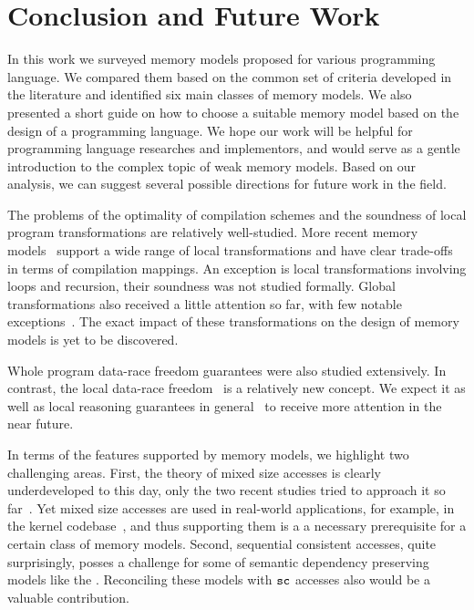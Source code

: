 \section{Conclusion and Future Work}
\label{sec:conclusion}

In this work we surveyed memory models 
proposed for various programming language. 
We compared them based on the common set of criteria
developed in the literature and identified 
six main classes of memory models.
We also presented a short guide on how to 
choose a suitable memory model based on 
the design of a programming language. 
We hope our work will be helpful for 
programming language researches and implementors,
and would serve as a gentle introduction 
to the complex topic of weak memory models. 
Based on our analysis, we can suggest several
possible directions for future work in the field. 

The problems of the optimality of compilation schemes
and the soundness of local program transformations are relatively well-studied.
More recent memory models~%
\cite{Lahav-al:PLDI17, Dolan-al:PLDI18, Kang-al:POPL17, Chakraborty-Vafeiadis:POPL19} 
support a wide range of local transformations and have clear 
trade-offs in terms of compilation mappings. 
An exception is local transformations involving loops and recursion, 
their soundness was not studied formally. 
Global transformations also received a little attention so far,
with few notable exceptions~\cite{PichonPharabod-Sewell:POPL16, Lee-al:PLDI20}.
The exact impact of these transformations on the design of 
memory models is yet to be discovered. 

Whole program data-race freedom guarantees were also studied extensively.
In contrast, the local data-race freedom~\cite{Dolan-al:PLDI18} 
is a relatively new concept. 
We expect it as well as local reasoning guarantees 
in general~\cite{Dodds-al:ESOP18, Jagadeesan-al:OOPSLA2020, Cho-al:PLDI21} 
to receive more attention in the near future.  

In terms of the features supported by memory models, 
we highlight two challenging areas.
First, the theory of mixed size accesses is clearly 
underdeveloped to this day, only the two recent studies 
tried to approach it so far~\cite{Flur-al:POPL17, Watt-al:PLDI2020}.
Yet mixed size accesses are used in real-world applications,
for example, in the \Linux kernel codebase~\cite{Flur-al:POPL17},
and thus supporting them is a a necessary prerequisite 
for a certain class of memory models. 
Second, sequential consistent accesses, quite surprisingly,
posses a challenge for some of semantic dependency preserving
models like the \Promising.
Reconciling these models with ${\mathtt{sc}}$ 
accesses also would be a valuable contribution.

